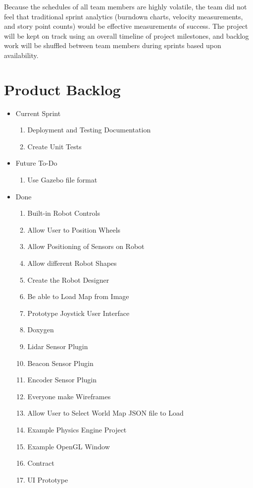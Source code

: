 Because the schedules of all team members are highly volatile, the team did not feel that traditional sprint analytics (burndown charts, velocity measurements, and story point counts) would be effective measurements of success. The project will be kept on track using an overall timeline of project milestones, and backlog work will be shuffled between team members during sprints based upon availability.

\section{Product Backlog}
 
\begin{itemize}
\item Current Sprint 
\begin{enumerate}
\item Deployment and Testing Documentation
\item Create Unit Tests
\end{enumerate}
\item Future To-Do 
\begin{enumerate}
\item Use Gazebo file format
\end{enumerate}
\item Done
\begin{enumerate}
\item Built-in Robot Controls 
\item Allow User to Position Wheels
\item Allow Positioning of Sensors on Robot
\item Allow different Robot Shapes
\item Create the Robot Designer
\item Be able to Load Map from Image
\item Prototype Joystick User Interface
\item Doxygen
\item Lidar Sensor Plugin
\item Beacon Sensor Plugin
\item Encoder Sensor Plugin
\item Everyone make Wireframes
\item Allow User to Select World Map JSON file to Load
\item Example Physics Engine Project
\item Example OpenGL Window
\item Contract
\item UI Prototype

\end{enumerate}
\end{itemize}
